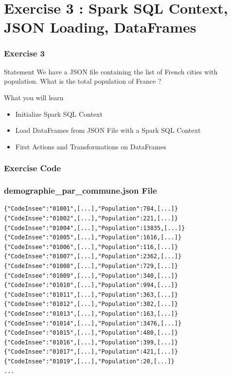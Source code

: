 \documentclass[slidetop,9pt,utf8]{beamer}
\begin{document}
\begin{CJK}{UTF8}{gbsn}
\begin{frame}
\end{frame}

\section{Exercise 3 : Spark SQL Context, JSON Loading, DataFrames}

\begin{frame}
  \frametitle{Exercise 3}

  \begin{block}{Statement}
    We have a JSON file containing the list of French cities with population. What is the total population of France ?
  \end{block}

  \begin{block}{What you will learn}
    \begin{itemize}
      \item Initialize Spark SQL Context
      \item Load DataFrames from JSON File with a Spark SQL Context
      \item First Actions and Transformations on DataFrames
    \end{itemize}
  \end{block}

\end{frame}

\begin{frame}
  \frametitle{Exercise Code}

  

\end{frame}

\begin{frame}[fragile]
  \frametitle{demographie\_par\_commune.json File}

  \begin{verbatim}
{"CodeInsee":"01001",[...],"Population":784,[...]}
{"CodeInsee":"01002",[...],"Population":221,[...]}
{"CodeInsee":"01004",[...],"Population":13835,[...]}
{"CodeInsee":"01005",[...],"Population":1616,[...]}
{"CodeInsee":"01006",[...],"Population":116,[...]}
{"CodeInsee":"01007",[...],"Population":2362,[...]}
{"CodeInsee":"01008",[...],"Population":729,[...]}
{"CodeInsee":"01009",[...],"Population":340,[...]}
{"CodeInsee":"01010",[...],"Population":994,[...]}
{"CodeInsee":"01011",[...],"Population":363,[...]}
{"CodeInsee":"01012",[...],"Population":302,[...]}
{"CodeInsee":"01013",[...],"Population":163,[...]}
{"CodeInsee":"01014",[...],"Population":3476,[...]}
{"CodeInsee":"01015",[...],"Population":480,[...]}
{"CodeInsee":"01016",[...],"Population":399,[...]}
{"CodeInsee":"01017",[...],"Population":421,[...]}
{"CodeInsee":"01019",[...],"Population":20,[...]}
...
  \end{verbatim}
\end{frame}


\end{CJK}
\end{document}
